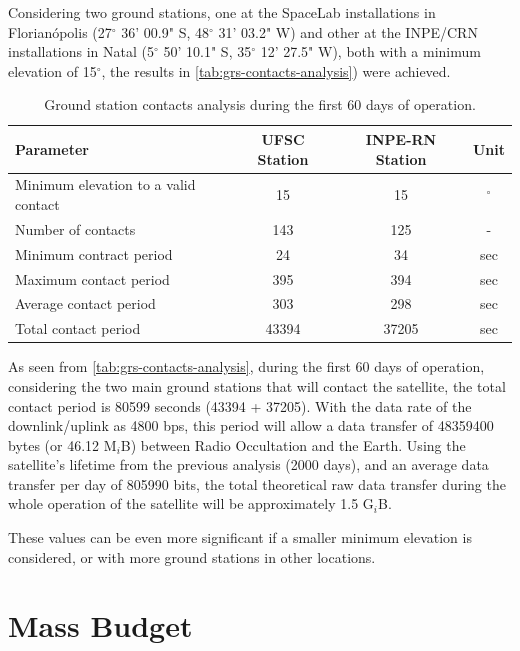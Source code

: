Considering two ground stations, one at the SpaceLab installations in Florianópolis (27$^{\circ}$ 36' 00.9" S, 48$^{\circ}$ 31' 03.2" W) and other at the INPE/CRN installations in Natal (5$^{\circ}$ 50' 10.1" S, 35$^{\circ}$ 12' 27.5" W), both with a minimum elevation of 15$^{\circ}$, the results in \autoref{tab:grs-contacts-analysis}) were achieved. %

\begin{table}[!h]
    \centering
    \begin{tabular}{lccc}
        \toprule[1.5pt]
        \textbf{Parameter} & \textbf{UFSC Station} & \textbf{INPE-RN Station} & \textbf{Unit} \\
        \midrule
        Minimum elevation to a valid contact    & 15    & 15    & $^{\circ}$ \\
        Number of contacts                      & 143   & 125   & - \\
        Minimum contract period                  & 24    & 34    & sec \\
        Maximum contact period                  & 395   & 394   & sec \\
        Average contact period                  & 303   & 298   & sec \\
        Total contact period                    & 43394 & 37205 & sec \\
        \bottomrule[1.5pt]
    \end{tabular}
    \caption{Ground station contacts analysis during the first 60 days of operation.}
    \label{tab:grs-contacts-analysis}
\end{table}

As seen from \autoref{tab:grs-contacts-analysis}, during the first 60 days of operation, considering the two main ground stations that will contact the satellite, the total contact period is 80599 seconds (43394 + 37205). With the data rate of the downlink/uplink as 4800 bps, this period will allow a data transfer of 48359400 bytes (or 46.12 M$_{i}$B) between Radio Occultation and the Earth. Using the satellite's lifetime from the previous analysis (2000 days), and an average data transfer per day of 805990 bits, the total theoretical raw data transfer during the whole operation of the satellite will be approximately 1.5 G$_{i}$B.

These values can be even more significant if a smaller minimum elevation is considered, or with more ground stations in other locations.

\section{Mass Budget} \label{mass-budget}

